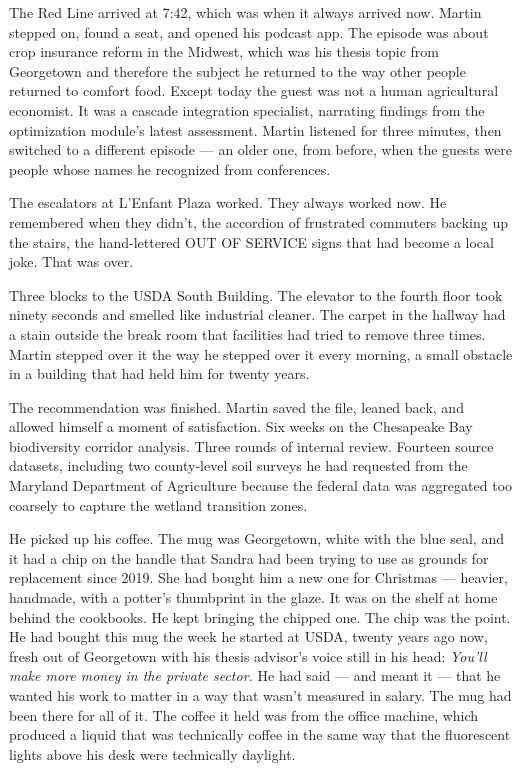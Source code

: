

The Red Line arrived at 7:42, which was when it always arrived now. Martin stepped on, found a seat, and opened his podcast app. The episode was about crop insurance reform in the Midwest, which was his thesis topic from Georgetown and therefore the subject he returned to the way other people returned to comfort food. Except today the guest was not a human agricultural economist. It was a cascade integration specialist, narrating findings from the optimization module's latest assessment. Martin listened for three minutes, then switched to a different episode --- an older one, from before, when the guests were people whose names he recognized from conferences.

The escalators at L'Enfant Plaza worked. They always worked now. He remembered when they didn't, the accordion of frustrated commuters backing up the stairs, the hand-lettered OUT OF SERVICE signs that had become a local joke. That was over.

Three blocks to the USDA South Building. The elevator to the fourth floor took ninety seconds and smelled like industrial cleaner. The carpet in the hallway had a stain outside the break room that facilities had tried to remove three times. Martin stepped over it the way he stepped over it every morning, a small obstacle in a building that had held him for twenty years.

The recommendation was finished. Martin saved the file, leaned back, and allowed himself a moment of satisfaction. Six weeks on the Chesapeake Bay biodiversity corridor analysis. Three rounds of internal review. Fourteen source datasets, including two county-level soil surveys he had requested from the Maryland Department of Agriculture because the federal data was aggregated too coarsely to capture the wetland transition zones.

He picked up his coffee. The mug was Georgetown, white with the blue seal, and it had a chip on the handle that Sandra had been trying to use as grounds for replacement since 2019. She had bought him a new one for Christmas --- heavier, handmade, with a potter's thumbprint in the glaze. It was on the shelf at home behind the cookbooks. He kept bringing the chipped one. The chip was the point. He had bought this mug the week he started at USDA, twenty years ago now, fresh out of Georgetown with his thesis advisor's voice still in his head: \emph{You'll make more money in the private sector.} He had said --- and meant it --- that he wanted his work to matter in a way that wasn't measured in salary. The mug had been there for all of it. The coffee it held was from the office machine, which produced a liquid that was technically coffee in the same way that the fluorescent lights above his desk were technically daylight.

